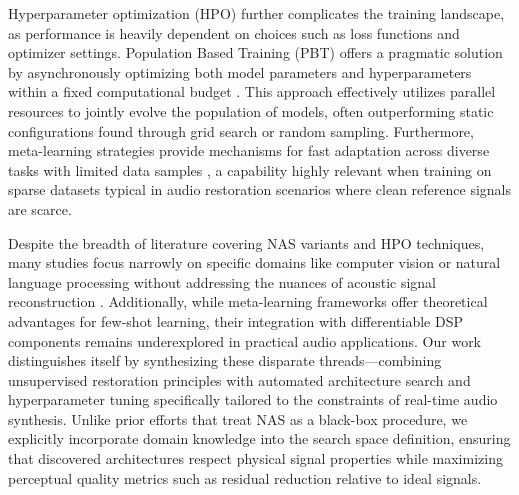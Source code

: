 Hyperparameter optimization (HPO) further complicates the training landscape, as performance is heavily dependent on choices such as loss functions and optimizer settings. Population Based Training (PBT) offers a pragmatic solution by asynchronously optimizing both model parameters and hyperparameters within a fixed computational budget \citep{jaderberg2017pbt}. This approach effectively utilizes parallel resources to jointly evolve the population of models, often outperforming static configurations found through grid search or random sampling. Furthermore, meta-learning strategies provide mechanisms for fast adaptation across diverse tasks with limited data samples \citep{finn2017maml}, a capability highly relevant when training on sparse datasets typical in audio restoration scenarios where clean reference signals are scarce.

Despite the breadth of literature covering NAS variants and HPO techniques, many studies focus narrowly on specific domains like computer vision or natural language processing without addressing the nuances of acoustic signal reconstruction \citep{elsken2019nas}. Additionally, while meta-learning frameworks offer theoretical advantages for few-shot learning, their integration with differentiable DSP components remains underexplored in practical audio applications. Our work distinguishes itself by synthesizing these disparate threads—combining unsupervised restoration principles with automated architecture search and hyperparameter tuning specifically tailored to the constraints of real-time audio synthesis. Unlike prior efforts that treat NAS as a black-box procedure, we explicitly incorporate domain knowledge into the search space definition, ensuring that discovered architectures respect physical signal properties while maximizing perceptual quality metrics such as residual reduction relative to ideal signals.
